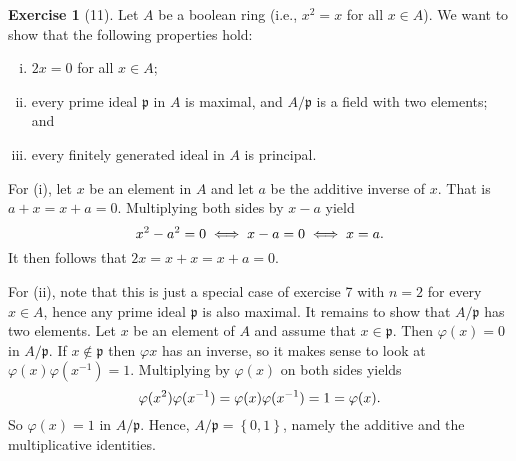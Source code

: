 \documentclass{article}
\theoremstyle{definition}
\newtheorem*{exercise}{Exercise}
\begin{document}
\begin{exercise}[11]
    Let $A$ be a boolean ring (i.e., $x^2 = x$ for all $x \in A$). We want
    to show that the following properties hold:
    \begin{enumerate}[(i)]
        \item $2x = 0$ for all $x \in A$;
        \item every prime ideal $\mathfrak{p}$ in $A$ is maximal, and
            $A / \mathfrak{p}$ is a field with two elements; and
        \item every finitely generated ideal in $A$ is principal.
    \end{enumerate}
    For (i), let $x$ be an element in $A$ and let $a$ be the additive
    inverse of $x$. That is $a + x = x + a = 0$. Multiplying both sides by
    $x - a$ yield
    \begin{equation}
        \notag
        x^2 - a^2 = 0 \iff x - a = 0 \iff x = a.
    \end{equation}
    It then follows that $2x = x + x = x + a = 0$.

    For (ii), note that this is just a special case of exercise 7 with $n =
    2$ for every $x \in A$, hence any prime ideal $\mathfrak{p}$ is also
    maximal. It remains to show that $A / \mathfrak{p}$ has two elements.
    Let $x$ be an element of $A$ and assume that $x \in \mathfrak{p}$. Then
    $\varphi(x) = 0$ in $A / \mathfrak{p}$. If $x \notin \mathfrak{p}$ then
    $\varphi{x}$ has an inverse, so it makes sense to look at
    $\varphi(x)\varphi(x^{-1}) = 1$. Multiplying by $\varphi(x)$ on both
    sides yields
    \begin{equation}
        \notag
        \varphi(x^2)\varphi(x^{-1}) = \varphi(x)\varphi(x^{-1}) = 1 = \varphi(x).
    \end{equation}
    So $\varphi(x) = 1$ in $A / \mathfrak{p}$. Hence, $A / \mathfrak{p} =
    \left\{0, 1\right\}$, namely the additive and the multiplicative
    identities.
\end{exercise}
\end{document}
